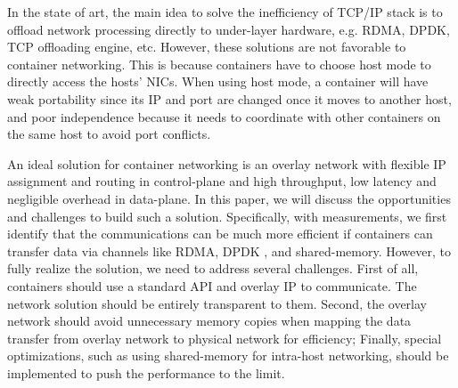 In the state of art, the main idea to solve the inefficiency of TCP/IP stack 
is to offload network processing directly to under-layer hardware, e.g. RDMA, 
DPDK, TCP offloading engine, etc. However, these solutions are not favorable to container networking. This is because containers have to choose host mode to directly access the hosts' NICs. When using host mode, a container
will have weak portability since its IP and port are changed once it moves
to another host, and poor independence because it needs to coordinate with
other containers on the same host to avoid port conflicts.

An ideal solution for container networking is an overlay network with flexible
IP assignment and routing in control-plane and high 
throughput, low latency and negligible overhead in data-plane. In this paper, we 
will discuss the opportunities and challenges to build such a solution. 
Specifically, with measurements, we first identify that the communications 
can be much more efficient if containers can transfer data via channels like
RDMA, DPDK , and shared-memory. However, to fully
realize the solution, we need to address several challenges. First of all, 
containers should use a standard API and overlay IP to communicate. The network
solution should be entirely transparent to them. Second, the overlay network
should avoid unnecessary memory copies when mapping the data transfer from
overlay network to physical network for efficiency; Finally, special optimizations, such as using shared-memory for intra-host networking, should be
implemented to push the performance to the limit.
